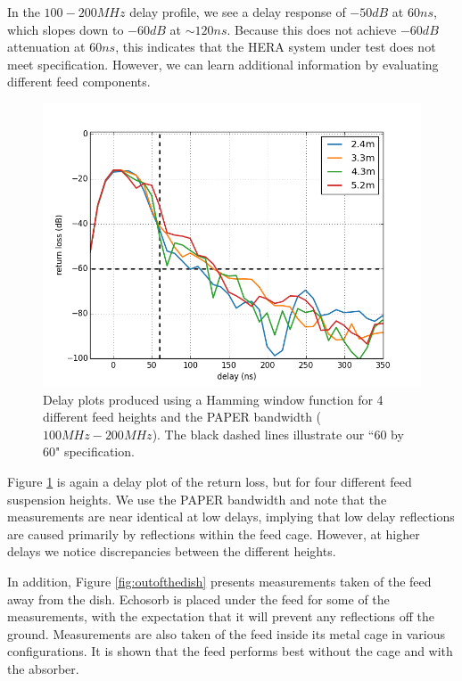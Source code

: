 \documentclass[12pt,preprint]{aastex}
\begin{document}
In the $100-200MHz$ delay profile, we see a delay response of $-50dB$ at $60ns$, which slopes down to $-60dB$ at $\sim120ns$.  Because
this does not achieve $-60dB$ attenuation at $60ns$, this indicates that the HERA system under test does not meet specification. However, we can learn additional information by evaluating
different feed components. 

\begin{figure}[ht!]
\centering
\includegraphics[totalheight=0.41\textheight]{plots/delay_heights_paper.png}
\caption{Delay plots produced using a Hamming window function for 4 different feed heights and the PAPER bandwidth ($100MHz-200MHz$). The black dashed lines illustrate our ``60 by 60" specification.}
\label{fig:elevator}
\end{figure}

Figure \ref{fig:elevator} is again a delay plot of the return loss, but for
four different feed suspension heights. We use the PAPER bandwidth and note
that the measurements are near identical at low delays, implying that low delay
reflections are caused primarily by reflections within the feed cage. However,
at higher delays we notice discrepancies between the different heights.

In addition, Figure \ref{fig:outofthedish} presents measurements taken of the feed
away from the dish. Echosorb is placed under the feed for some of the
measurements, with the expectation that it will prevent any reflections off the
ground. Measurements are also taken of the feed inside its metal cage in
various configurations. It is shown that the feed performs best without the cage and with the absorber. 
\end{document}

